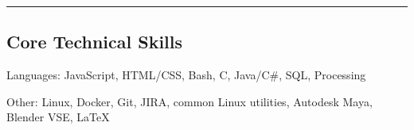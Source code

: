 \documentclass[10pt, letterpaper]{article}
\newenvironment{indentsection}[1]%
{\begin{list}{}%
	{\setlength{\leftmargin}{#1}}%
	\item[]%
}
{\end{list}}
\newcommand{\CPP}
{C\nolinebreak[4]\hspace{-.05em}\raisebox{.22ex}{\footnotesize\bf ++}}
\begin{document}
\hrule
\vspace{-0.4em}

\subsection*{Core Technical Skills}
\begin{indentsection}{\parindent}
\begin{description*}
	\item[Languages:]
	JavaScript, HTML/CSS, Bash, \CPP, Java/C\#, SQL, Processing
	\item[Other:]
	Linux, Docker, Git, JIRA, common Linux utilities, Autodesk Maya, Blender VSE, \LaTeX
\end{description*}
\end{indentsection}
\end{document}
